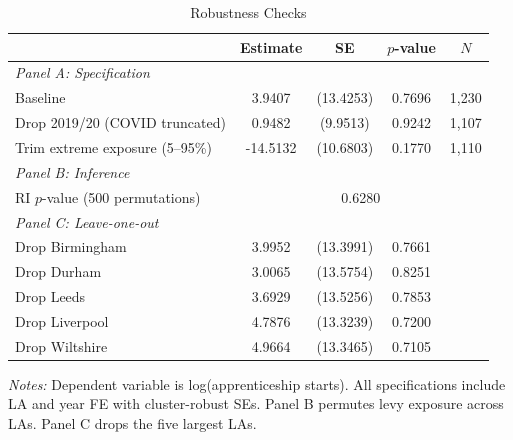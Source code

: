 \begin{table}[htbp]
\centering
\caption{Robustness Checks}
\label{tab:robustness}
\begin{tabular}{lcccc}
\hline\hline
 & Estimate & SE & $p$-value & $N$ \\
\hline
\multicolumn{5}{l}{\textit{Panel A: Specification}} \\
Baseline & 3.9407 & (13.4253) & 0.7696 & 1,230 \\
Drop 2019/20 (COVID truncated) & 0.9482 & (9.9513) & 0.9242 & 1,107 \\
Trim extreme exposure (5--95\%) & -14.5132 & (10.6803) & 0.1770 & 1,110 \\
[4pt]
\multicolumn{5}{l}{\textit{Panel B: Inference}} \\
RI $p$-value (500 permutations) & \multicolumn{4}{c}{0.6280} \\
[4pt]
\multicolumn{5}{l}{\textit{Panel C: Leave-one-out}} \\
Drop Birmingham & 3.9952 & (13.3991) & 0.7661 & \\
Drop Durham & 3.0065 & (13.5754) & 0.8251 & \\
Drop Leeds & 3.6929 & (13.5256) & 0.7853 & \\
Drop Liverpool & 4.7876 & (13.3239) & 0.7200 & \\
Drop Wiltshire & 4.9664 & (13.3465) & 0.7105 & \\
\hline\hline
\end{tabular}
\begin{tablenotes}\small
\item \textit{Notes:} Dependent variable is log(apprenticeship starts). All specifications include LA and year FE with cluster-robust SEs. Panel B permutes levy exposure across LAs. Panel C drops the five largest LAs.
\end{tablenotes}
\end{table}

